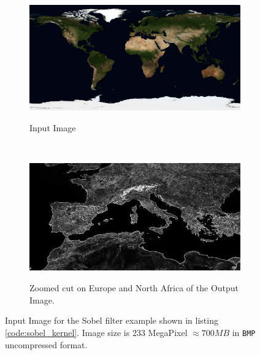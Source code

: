 \begin{figure}
	\begin{subfigure}{1.0\textwidth}
		\caption{Input Image}
		\includegraphics[width=\linewidth]{./images/opencal/sobel_input}
		\label{fig:sobel_input}
		
	\end{subfigure}	
	\endminipage\hfill \\
		\begin{subfigure}{1.0\textwidth}
		\includegraphics[width=\linewidth]{./images/opencal/sobel_output_detail}
		\label{fig:sobel_output_detail}
		\caption{Zoomed cut on Europe and North Africa of the Output Image.}
	\end{subfigure}
	\endminipage
		\caption{Input Image for the Sobel filter example shown in listing \ref{code:sobel_kernel}. Image size is 233 MegaPixel $\approx 700  \si{MB}$ in \texttt{BMP} uncompressed format.}
		\label{fig:sobel_result}
\end{figure}



